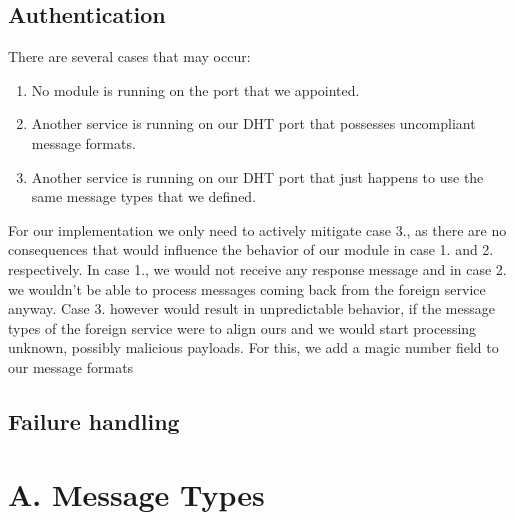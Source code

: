 \documentclass[a4paper, 11pt]{article}
\begin{document}
\subsection*{Authentication}



There are several cases that may occur:

\begin{enumerate}
	\item No module is running on the port that we appointed.
	\item Another service is running on our DHT port that possesses uncompliant message formats.
	\item Another service is running on our DHT port that just happens to use the same message types that we defined.
\end{enumerate}

For our implementation we only need to actively mitigate case 3., as there are no consequences that would influence the behavior of our module in case 1. and 2. respectively. In case 1., we would not receive any response message and in case 2. we wouldn't be able to process messages coming back from the foreign service anyway. Case 3. however would result in unpredictable behavior, if the message types of the foreign service were to align ours and we would start processing unknown, possibly malicious payloads. For this, we add a magic number field to our message formats 

\subsection*{Failure handling}


\pagebreak

\section*{A. Message Types}




%
%
\end{document}
